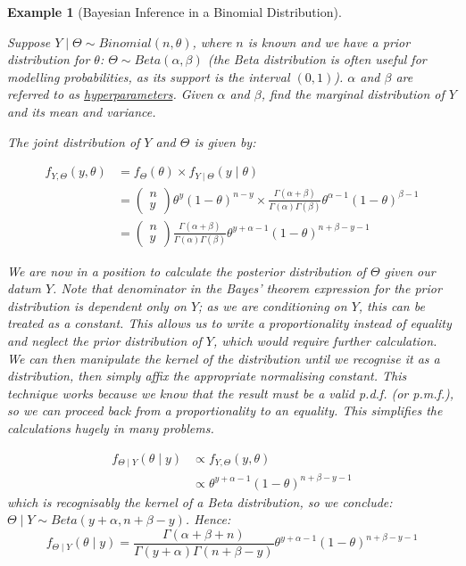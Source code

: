 \documentclass[12pt,a4paper]{article}
\newtheorem{ex}[thm]{Example}
\begin{document}
\begin{ex}[Bayesian Inference in a Binomial Distribution]$\;$\par\vspace{1cm}

Suppose $Y\mid\Theta \sim Binomial(n,\theta)$, where $n$ is known and we have a prior distribution for $\theta$: $\Theta \sim Beta(\alpha,\beta)$ (the Beta distribution is often useful for modelling probabilities, as its support is the interval $(0,1)$). $\alpha$ and $\beta$ are referred to as \underline{hyperparameters}. Given $\alpha$ and $\beta$, find the marginal distribution of $Y$ and its mean and variance.

The joint distribution of $Y$ and $\Theta$ is given by:

\begin{align*}
f_{Y,\Theta}(y,\theta) &= f_\Theta(\theta) \times f_{Y\mid\Theta}(y\mid\theta)\\
&= \left(\begin{array}{c} \!\!n\!\! \\ \!\!y\!\!\end{array}\right)\theta^y (1-\theta)^{n-y} \times \frac{\Gamma(\alpha + \beta)}{\Gamma(\alpha)\Gamma(\beta)}\theta^{\alpha-1} (1-\theta)^{\beta -1}\\
&= \left(\begin{array}{c}\!\!n\!\! \\ \!\!y\!\!\end{array}\right) \frac{\Gamma(\alpha + \beta)}{\Gamma(\alpha)\Gamma(\beta)} \theta^{y+\alpha-1} (1-\theta)^{n+\beta - y -1}
\end{align*}

We are now in a position to calculate the posterior distribution of $\Theta$ given our datum $Y$. Note that denominator in the Bayes' theorem expression for the prior distribution is dependent only on $Y$; as we are conditioning on $Y$, this can be treated as a constant. This allows us to write a proportionality instead of equality and neglect the prior distribution of $Y$, which would require further calculation. We can then manipulate the kernel of the distribution until we recognise it as a distribution, then simply affix the appropriate normalising constant. This technique works because we know that the result must be a valid p.d.f. (or p.m.f.), so we can proceed back from a proportionality to an equality. This simplifies the calculations hugely in many problems.

\begin{align*}
f_{\Theta\mid Y}(\theta\mid y) &\propto f_{Y,\Theta}(y,\theta)\\
&\propto \theta^{y+\alpha-1} (1-\theta)^{n+\beta-y-1}
\end{align*}
which is recognisably the kernel of a Beta distribution, so we conclude: $\Theta\mid Y \sim Beta(y+\alpha,n+\beta-y)$. Hence:
$$f_{\Theta\mid Y}(\theta\mid y) = \frac{\Gamma(\alpha+\beta+n)}{\Gamma(y+\alpha)\Gamma(n+\beta -y)} \theta^{y+\alpha-1} (1-\theta)^{n+\beta-y-1}$$


\end{ex}
\end{document}
